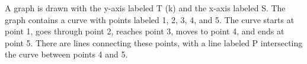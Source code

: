 A graph is drawn with the y-axis labeled T (k) and the x-axis labeled S. The graph contains a curve with points labeled 1, 2, 3, 4, and 5. The curve starts at point 1, goes through point 2, reaches point 3, moves to point 4, and ends at point 5. There are lines connecting these points, with a line labeled P intersecting the curve between points 4 and 5.